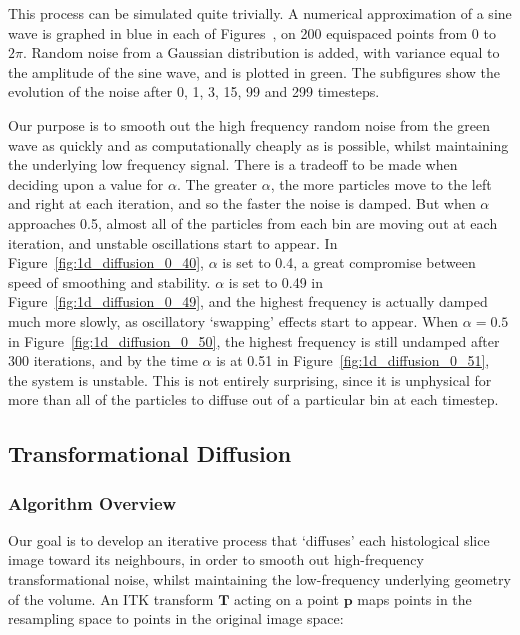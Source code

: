 	  
	
	  This process can be simulated quite trivially. A numerical approximation of a sine wave is graphed in blue in each of Figures~, on 200 equispaced points from $0$ to $2\pi$. Random noise from a Gaussian distribution is added, with variance equal to the amplitude of the sine wave, and is plotted in green. The subfigures show the evolution of the noise after 0, 1, 3, 15, 99 and 299 timesteps.
  
	  Our purpose is to smooth out the high frequency random noise from the green wave as quickly and as computationally cheaply as is possible, whilst maintaining the underlying low frequency signal. There is a tradeoff to be made when deciding upon a value for $\alpha$. The greater $\alpha$, the more particles move to the left and right at each iteration, and so the faster the noise is damped. But when $\alpha$ approaches 0.5, almost all of the particles from each bin are moving out at each iteration, and unstable oscillations start to appear. In Figure~\ref{fig:1d_diffusion_0_40}, $\alpha$ is set to 0.4, a great compromise between speed of smoothing and stability. $\alpha$ is set to 0.49 in Figure~\ref{fig:1d_diffusion_0_49}, and the highest frequency is actually damped much more slowly, as oscillatory `swapping' effects start to appear. When $\alpha = 0.5$ in Figure~\ref{fig:1d_diffusion_0_50}, the highest frequency is still undamped after 300 iterations, and by the time $\alpha$ is at 0.51 in Figure~\ref{fig:1d_diffusion_0_51}, the system is unstable. This is not entirely surprising, since it is unphysical for more than all of the particles to diffuse out of a particular bin at each timestep.
		
	\subsection{Transformational Diffusion} %
	\label{sub:transformational_diffusion}
    \subsubsection{Algorithm Overview} %
    \label{ssub:algorithm_overview}
  	  Our goal is to develop an iterative process that `diffuses' each histological slice image toward its neighbours, in order to smooth out high-frequency transformational noise, whilst maintaining the low-frequency underlying geometry of the volume. An ITK transform $\mathbf{T}$ acting on a point $\mathbf{p}$ maps points in the resampling space to points in the original image space:
		  
